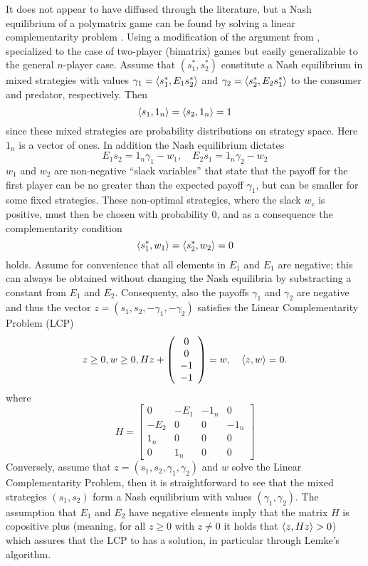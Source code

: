 It does not appear to have diffused through the literature, but a Nash equilibrium of a polymatrix game can be found by solving a linear complementarity problem \citep{miller1991copositive}. Using a modification of the argument from \citep{miller1991copositive}, specialized to the case of two-player (bimatrix) games but easily generalizable to the general $n$-player case. Assume that $(s^*_1,s^*_2)$ constitute a Nash equilibrium in mixed strategies with values $\gamma_1 = \left \langle s^*_1,E_1 s^*_2 \right \rangle$ and  $\gamma_2 = \left \langle s^*_2,E_2 s^*_1 \right \rangle$ to the consumer and predator, respectively. Then
\[
  \left \langle s_1,1_n \right \rangle =
  \left \langle s_2,1_n \right \rangle =
  1
\]
since these mixed strategies are probability distributions on strategy space. Here $1_n$ is a vector of ones. In addition the Nash equilibrium dictates
\[
  E_1 s_2 = 1_n \gamma_1 - w_1
  ,\quad
  E_2 s_1 = 1_n \gamma_2  - w_2
\]
$w_1$ and $w_2$ are non-negative ``slack variables'' that state that the payoff for the first player can be no greater than the expected payoff $\gamma_1$, but can be smaller for some fixed strategies. These non-optimal strategies, where the slack $w_c$ is positive, must then be chosen with probability 0, and as a consequence the complementarity condition
\[
  \left \langle s^*_1,w_1 \right \rangle =   \left \langle s^*_2,w_2 \right \rangle = 0
\]
holds. Assume for convenience that all elements in $E_1$ and $E_1$ are negative; this can always be obtained without changing the Nash equilibria by substracting a constant from $E_1$ and $E_2$. Consequenty, also the payoffs $\gamma_1$ and $\gamma_2$ are negative and thus the vector $z = (s_1,s_2,-\gamma_1,-\gamma_2)$ satisfies the Linear Complementarity Problem (LCP)
\[
\label{eq:lcp}
  z \geq 0,
  w \geq 0 ,
  H
  z
  +
  \left(
    \begin{array}{c}
      0 \\
      0 \\
      -1 \\
      -1
    \end{array}
  \right)
  =
  w
  ,
  \quad
  \left \langle z,w \right \rangle = 0
  .
\]
where
\[
  H =
  \left[
    \begin{array}{cccc}
      0 & -E_1 & -1_n & 0 \\ -E_2 & 0 & 0 & -1_n \\
      1_n & 0 & 0 & 0 \\
      0 & 1_n & 0 & 0
    \end{array}
  \right]
\]
Conversely, assume that $z=(s_1,s_2,\gamma_1,\gamma_2)$ and $w$ solve the Linear Complementarity Problem, then it is straightforward to see that the mixed strategies $(s_1,s_2)$ form a Nash equilibrium with values $(\gamma_1,\gamma_2)$. The assumption that $E_1$ and $E_2$ have negative elements imply that the matrix $H$ is copositive plus (meaning, for all $z\geq0$ with $z\neq0$ it holds that $\left \langle z,Hz \right \rangle>0$) which assures that the LCP to has a solution, in particular through Lemke's algorithm.

